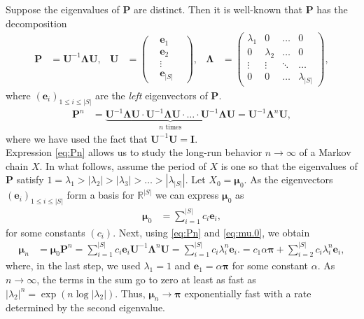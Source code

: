 \documentclass[12pt]{book}
\numberwithin{equation}{chapter}
\theoremstyle{plain}
\numberwithin{theorem}{section}
\theoremstyle{definition}
\numberwithin{exercise}{chapter}
\newcommand{\<}{\langle}
\renewcommand{\>}{\rangle}
\renewcommand{\(}{\left(}
\renewcommand{\)}{\right)}
\renewcommand{\[}{\left[}
\renewcommand{\]}{\right]}
\newcommand\Rb{\mathds{R}}
\newcommand\lam{\lambda}
\newcommand\del{\delta}
\newcommand\ev{\pmb{e}}
\newcommand\Iv{\pmb{I}}
\newcommand\Pv{\pmb{P}}
\newcommand\Uv{\pmb{U}}
\newcommand\muv{\pmb{\mu}}
\newcommand\piv{\pmb{\pi}}
\newcommand\Lamv{\pmb{\Lambda}}
\begin{document}
\noindent
Suppose the eigenvalues of $\Pv$ are distinct.  Then it is well-known that $\Pv$ has the decomposition
\begin{align}
\Pv
	&=	\Uv^{-1} \Lamv \Uv , &
\Uv
	&=	\( \begin{array}{ccc}
			{} & \ev_1 & {} \\
			{} & \ev_2 & {} \\
			{} & \vdots & {} \\
			{} & \ev_{|S|} 
			\end{array} \) , &
\Lamv
	&=	\( \begin{array}{cccc}
			\lam_1 & 0 & \ldots & 0 \\
			0 & \lam_2 & \ldots & 0 \\
			\vdots & \vdots & \ddots & \ldots \\
			0 & 0 & \ldots & \lam_{|S|}
			\end{array} \) ,
\end{align}
where $(\ev_i)_{1 \leq i \leq |S|}$ are the \emph{left} eigenvectors of $\Pv$.
\begin{align}
\Pv^n
	&=	\underbrace{\Uv^{-1} \Lamv \Uv \cdot \Uv^{-1} \Lamv \Uv \cdot \ldots \cdot \Uv^{-1} \Lamv \Uv }_{\text{$n$ times}}
	=	\Uv^{-1} \Lamv^n \Uv , \label{eq:Pn}
\end{align}
where we have used the fact that $\Uv^{-1} \Uv = \Iv$.
\\[0.5em]
Expression \eqref{eq:Pn} allows us to study the long-run behavior $n \to \infty$ of a Markov chain $X$.  
In what follows, assume the period of $X$ is one so that the eigenvalues of $\Pv$ satisfy
$1 = \lam_1 > |\lam_2| > |\lam_3| > \ldots > |\lam_{|S|}|$.
Let $X_0 = \muv_0$.  As the eigenvectors $(\ev_i)_{1 \leq i \leq |S|}$ form a basis for $\Rb^{|S|}$ we can express $\muv_0$ as
\begin{align}
\muv_0
	&=	\sum_{i=1}^{|S|} c_i \ev_i , \label{eq:mu.0}
\end{align}
for some constants $(c_i)$.  Next, using \eqref{eq:Pn} and \eqref{eq:mu.0}, we obtain
\begin{align}
\muv_n
	&=	\muv_0 \Pv^n 
	=	\sum_{i=1}^{|S|} c_i \ev_i \Uv^{-1} \Lamv^n \Uv
	=	\sum_{i=1}^{|S|} c_i \lam_i^n \ev_i .
	=	 c_1 \alpha \piv +  \sum_{i=2}^{|S|} c_i \lam_i^n \ev_i ,
\end{align}
where, in the last step, we used $\lam_1 = 1$ and $\ev_1 = \alpha \piv$ for some constant $\alpha$.  As $n \to \infty$, the terms in the sum go to zero at least as fast as $|\lam_2|^n = \exp( n \log |\lam_2| )$.  Thus, $\muv_n \to \piv$ exponentially fast with a rate determined by the second eigenvalue.
\end{document}
